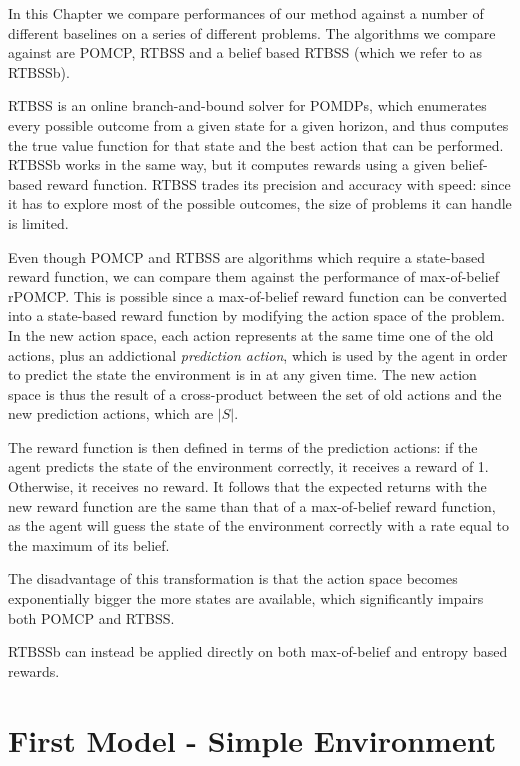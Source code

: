 In this Chapter we compare performances of our method against a number of different baselines on
a series of different problems. The algorithms we compare against are POMCP, RTBSS and a belief
based RTBSS (which we refer to as RTBSSb).

RTBSS is an online branch-and-bound solver for POMDPs, which enumerates every possible outcome from
a given state for a given horizon, and thus computes the true value function for that state and
the best action that can be performed. RTBSSb works in the same way, but it computes rewards using a
given belief-based reward function. RTBSS trades its precision and accuracy with speed: since it has
to explore most of the possible outcomes, the size of problems it can handle is limited.

Even though POMCP and RTBSS are algorithms which require a state-based reward function, we can
compare them against the performance of max-of-belief rPOMCP. This is possible since a max-of-belief
reward function can be converted into a state-based reward function by modifying the action space of
the problem. In the new action space, each action represents at the same time one of the old
actions, plus an addictional \textit{prediction action}, which is used by the agent in order to
predict the state the environment is in at any given time. The new action space is thus the result
of a cross-product between the set of old actions and the new prediction actions, which are $|S|$.


The reward function is then defined in terms of the prediction actions: if the agent predicts the
state of the environment correctly, it receives a reward of 1. Otherwise, it receives no reward. It
follows that the expected returns with the new reward function are the same than that of a
max-of-belief reward function, as the agent will guess the state of the environment correctly with a
rate equal to the maximum of its belief.

The disadvantage of this transformation is that the action space becomes exponentially bigger the
more states are available, which significantly impairs both POMCP and RTBSS.

RTBSSb can instead be applied directly on both max-of-belief and entropy based rewards.

\section{First Model - Simple Environment}

